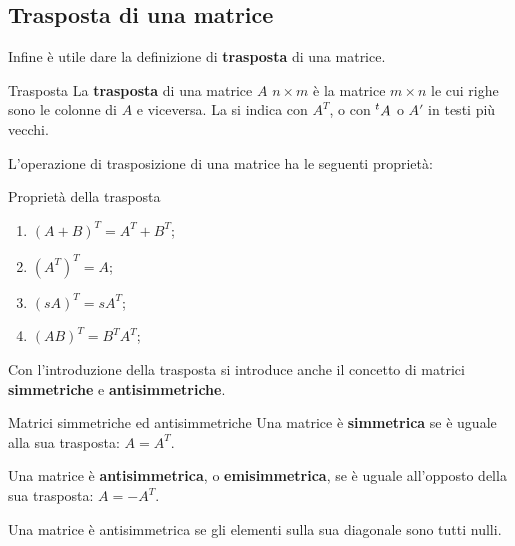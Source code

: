 \subsection{Trasposta di una matrice}
Infine è utile dare la definizione di \textbf{trasposta} di una matrice.
\begin{newdef}{Trasposta}
    La \textbf{trasposta} di una matrice $A$ $n \times m$ è la matrice $m \times n$ le cui righe sono le colonne di $A$ e viceversa. La si indica con $A^T$, o con $\prescript{t}{}{A}$ o $A'$ in testi più vecchi.
\end{newdef}
L'operazione di trasposizione di una matrice ha le seguenti proprietà:
\begin{teo}{Proprietà della trasposta}
    \begin{enumerate}
        \item $(A + B)^T = A^T + B^T$;
        \item $(A^T)^T = A$;
        \item $(sA)^T = sA^T$;
        \item $(AB)^T = B^T A^T$;
    \end{enumerate}
\end{teo}
Con l'introduzione della trasposta si introduce anche il concetto di matrici \textbf{simmetriche} e \textbf{antisimmetriche}.
\begin{newdef}{Matrici simmetriche ed antisimmetriche}
    Una matrice è \textbf{simmetrica} se è uguale alla sua trasposta: $A = A^T$.

    Una matrice è \textbf{antisimmetrica}, o \textbf{emisimmetrica}, se è uguale all'opposto della sua trasposta: $A = -A^T$.
\end{newdef}
\begin{nb}
    Una matrice è antisimmetrica se gli elementi sulla sua diagonale sono tutti nulli.
\end{nb}
